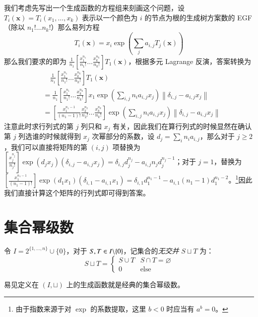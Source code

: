 \begin{solution}
我们考虑先写出一个生成函数的方程组来刻画这个问题，设 $T_i(\mathbf x)=T_i(x_1,\dots,x_k)$ 表示以一个颜色为 $i$ 的节点为根的生成树方案数的 EGF（除以 $n_1!\dots n_k!$）那么易列方程
$$
T_i(\mathbf x)=x_i \exp \left(\sum_j a_{i,j} T_j(\mathbf x) \right)
$$
那么我们要求的即为 $\frac 1{n_1}\left[\frac{x_1^{n_1}}{n_1!}\dots\frac{x_k^{n_k}}{n_k!}\right] T_1(\mathbf x)$，根据多元 Lagrange 反演，答案转换为
\begin{align*}
&\quad\frac 1{n_1}\left[\frac{x_1^{n_1}}{n_1!}\dots\frac{x_k^{n_k}}{n_k!}\right] T_1(\mathbf x)\\
&= \frac 1{n_1}\left[\frac{x_1^{n_1}}{n_1!}\dots\frac{x_k^{n_k}}{n_k!}\right] x_1\exp\left(\sum_{i,j} n_ia_{i,j}x_j\right) \left \| \delta_{i,j}-a_{i,j}x_j \right\|\\
&= \left[\frac{x_1^{n_1-1}}{(n_1-1)!}\frac{x_2^{n_2}}{n_2!}\dots\frac{x_k^{n_k}}{n_k!}\right] \exp\left(\sum_{i,j} n_ia_{i,j}x_j\right) \left \| \delta_{i,j}-a_{i,j}x_j \right\|
\end{align*}
注意此时求行列式的第 $j$ 列只和 $x_j$ 有关，因此我们在算行列式的时候显然在确认第 $j$ 列选谁的时候就得到 $x_j$ 次幂部分的系数，设 $d_j=\sum_i n_ia_{i,j}$，那么对于 $j\ge 2$，我们可以直接将矩阵的第 $(i,j)$ 项替换为 $\left[\frac{x_j^{n_j}}{n_j!}\right] \exp (d_jx_j)(\delta_{i,j} - a_{i,j}x_j) = \delta_{i,j} d_j^{n_j} - a_{i,j} n_j d_j^{n_j-1}$；对于 $j=1$，替换为 $\left[\frac{x_1^{n_1-1}}{(n_1-1)!}\right] \exp (d_1x_1)(\delta_{i,1} - a_{i,1}x_1) = \delta_{i,1} d_1^{n_1-1} - a_{i,1} (n_1-1) d_1^{n_1-2}$。\footnote{由于指数来源于对 $\exp$ 的系数提取，这里 $b<0$ 时应当有 $a^b=0$。}因此我们直接计算这个矩阵的行列式即可得到答案。
\end{solution}

\section{集合幂级数}

\begin{definition}[集合幂级数的集合定义]
令 $I=2^{\{1,\dots,n\}}\cup\{0\}$，对于 $S,T\in {I \backslash \{0\}}$，记集合的\emph{无交并} $S\sqcup T$ 为：
$$
S\sqcup T = \begin{cases}
S \cup T & S\cap T = \varnothing\\
0 & \mathrm{else}
\end{cases}
$$

易见定义在 $(I,\sqcup)$ 上的生成函数就是经典的集合幂级数。
\end{definition}

